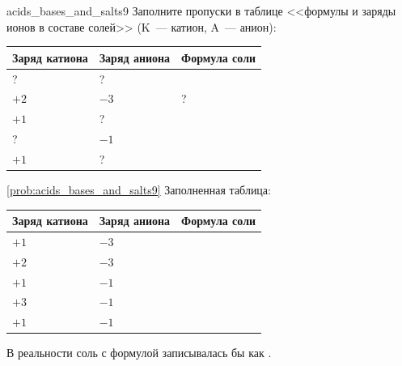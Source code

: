 \begin{problem}{}{acids_bases_and_salts9}
    Заполните пропуски в таблице <<формулы и заряды ионов в составе солей>> (K~--- катион, A~--- анион):
    \begin{center}
    \small
    \begin{tabularx}{\textwidth}{
        >{\hsize}Z
        >{\hsize}Z
        >{\hsize}Z
        }
        \hline
        Заряд катиона & Заряд аниона & Формула соли \\
        \hline
        ? & ? &  \\
        \hline
        $+2$ & $-3$ & ? \\
        \hline
        $+1$ & ? &  \\
        \hline
        ? & $-1$ &  \\
        \hline
        $+1$ & ? &  \\
        \hline
    \end{tabularx}
    \end{center}
    \begin{sol}{\ref{prob:acids_bases_and_salts9}}
        Заполненная таблица:
        \begin{center}
        \small
        \begin{tabularx}{\textwidth}{
            >{\hsize}Z
            >{\hsize}Z
            >{\hsize}Z
            }
            \hline
            Заряд катиона & Заряд аниона & Формула соли \\
            \hline
            $+1$ & $-3$ &  \\
            \hline
            $+2$ & $-3$ &  \\
            \hline
            $+1$ & $-1$ &  \\
            \hline
            $+3$ & $-1$ &  \\
            \hline
            $+1$ & $-1$ &  \\
            \hline
        \end{tabularx}
        \end{center}
        В реальности соль с формулой  записывалась бы как .
    \end{sol}
\end{problem}

